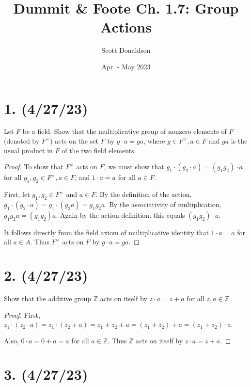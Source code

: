 \documentclass{article}
\title{Dummit \& Foote Ch. 1.7: Group Actions}
\author{Scott Donaldson}
\date{Apr. - May 2023}
\begin{document}
\maketitle

\section*{1. (4/27/23)}

Let $F$ be a field. Show that the multiplicative group of nonzero elements of $F$ (denoted by $F^\times$) acts on the set $F$ by $g \cdot a = ga$, where $g \in F^\times, a \in F$ and $ga$ is the usual product in $F$ of the two field elements.

\begin{proof}
    To show that $F^\times$ acts on $F$, we must show that $g_1 \cdot (g_2 \cdot a) = (g_1 g_2) \cdot a$ for all $g_1, g_2 \in F^\times, a \in F$, and $1 \cdot a = a$ for all $a \in F$.

    First, let $g_1, g_2 \in F^\times$ and $a \in F$. By the definition of the action, $g_1 \cdot (g_2 \cdot a) = g_1 \cdot (g_2 a) = g_1 g_2 a$. By the associativity of multiplication, $g_1 g_2 a = (g_1 g_2) a$. Again by the action definition, this equals $(g_1 g_2) \cdot a$.
    
    It follows directly from the field axiom of multiplicative identity that $1 \cdot a = a$ for all $a \in A$. Thus $F^\times$ acts on $F$ by $g \cdot a = ga$.
\end{proof}

\section*{2. (4/27/23)}

Show that the additive group $\mathbb{Z}$ acts on itself by $z \cdot a = z + a$ for all $z, a \in \mathbb{Z}$.

\begin{proof}
    First, $z_1 \cdot (z_2 \cdot a) = z_1 \cdot (z_2 + a) = z_1 + z_2 + a = (z_1 + z_2) + a = (z_1 + z_2) \cdot a$.

    Also, $0 \cdot a = 0 + a = a$ for all $a \in \mathbb{Z}$. Thus $\mathbb{Z}$ acts on itself by $z \cdot a = z + a$.
\end{proof}

\section*{3. (4/27/23)}
\end{document}
